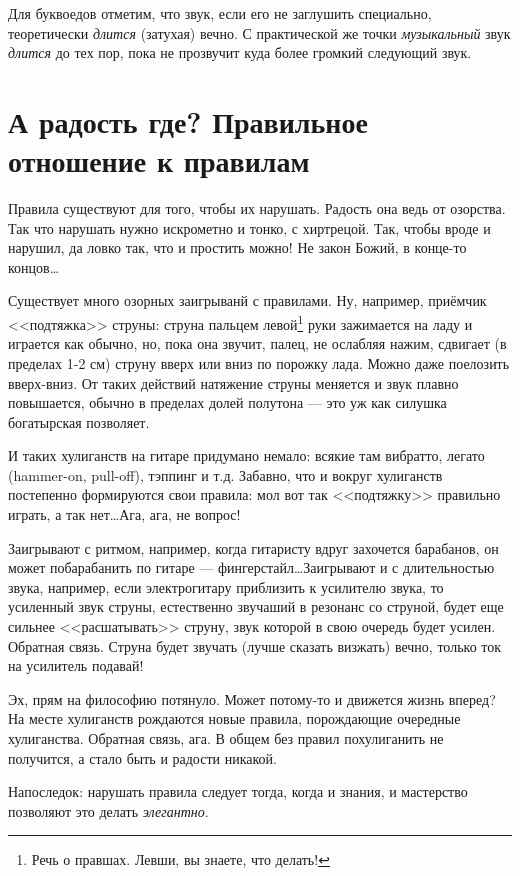 Для буквоедов отметим, что звук, если его не заглушить специально, теоретически \emph{длится} (затухая) вечно. С практической же точки \emph{музыкальный} звук \emph{длится} до тех пор, пока не прозвучит куда более громкий следующий звук. 


\section{А радость где? Правильное отношение к правилам}
\label{ch:music:rules}

Правила существуют для того, чтобы их нарушать. Радость она ведь от озорства. Так что нарушать нужно искрометно и тонко, с хиртрецой. Так, чтобы вроде и нарушил, да ловко так, что и простить можно! Не закон Божий, в конце-то концов\ldots

Существует много озорных заигрыванй с правилами. Ну, например, приёмчик <<подтяжка>> струны: струна пальцем левой\footnote{Речь о правшах. Левши, вы знаете, что делать!} руки зажимается на ладу и играется как обычно, но, пока она звучит, палец, не ослабляя нажим, сдвигает (в пределах 1-2 см) струну вверх или вниз по порожку лада. Можно даже поелозить вверх-вниз. От таких действий натяжение струны меняется и звук плавно повышается, обычно в пределах долей полутона --- это уж как силушка богатырская позволяет. 

И таких хулиганств на гитаре придумано немало: всякие там вибратто, легато (hammer-on, pull-off), тэппинг и т.д. Забавно, что и вокруг хулиганств постепенно формируются свои правила: мол вот так <<подтяжку>> правильно играть, а так нет\ldots Ага, ага, не вопрос!

Заигрывают с ритмом, например, когда гитаристу вдруг захочется барабанов, он может побарабанить по гитаре --- фингерстайл\ldots Заигрывают и с длительностью звука, например, если электрогитару приблизить к усилителю звука, то усиленный звук струны, естественно звучаший в резонанс со струной, будет еще сильнее <<расшатывать>> струну, звук которой в свою очередь будет усилен. Обратная связь. Струна будет звучать (лучше сказать визжать) вечно, только ток на усилитель подавай!

Эх, прям на философию потянуло. Может потому-то и движется жизнь вперед? На месте хулиганств рождаются новые правила, порождающие очередные хулиганства. Обратная связь, ага. В общем без правил похулиганить не получится, а стало быть и радости никакой.

Напоследок: нарушать правила следует тогда, когда и знания, и мастерство позволяют это делать \emph{элегантно}.